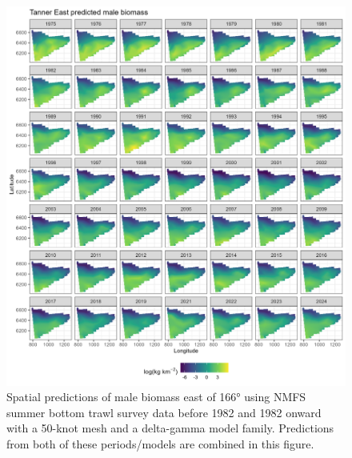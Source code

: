 \documentclass[
]{article}
\begin{document}
\begin{figure}

{\centering \includegraphics[width=1\linewidth,height=1\textheight]{../BAIRDI/Figures/TannerE_male_spatbio} 

}

\caption{Spatial predictions of male biomass east of 166° using NMFS summer bottom trawl survey data before 1982 and 1982 onward with a 50-knot mesh and a delta-gamma model family. Predictions from both of these periods/models are combined in this figure.}\label{fig:spatpred-bio-50-maleE}
\end{figure}
\end{document}
